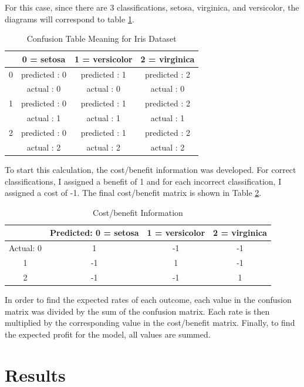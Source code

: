 \documentclass[journal]{IEEEtran}
\begin{document}
For this case, since there are 3 classifications, setosa, virginica, and versicolor, the diagrams will correspond to table \ref{table:cm-meaning}.

\begin{table}[h!]
\centering
\begin{tabular}{ c || c | c | c }
& 0 = setosa &  1 = versicolor &  2 = virginica \\
\hline
\hline
0 & predicted : 0 & predicted : 1 & predicted : 2 \\
& actual : 0 & actual : 0 & actual : 0 \\
\hline
1 & predicted : 0 & predicted : 1 & predicted : 2 \\
& actual : 1 & actual : 1 & actual : 1 \\
\hline
2 & predicted : 0 & predicted : 1 & predicted : 2 \\
& actual : 2 & actual : 2 & actual : 2 \\
\end{tabular}
\caption{Confusion Table Meaning for Iris Dataset}
\label{table:cm-meaning}
\end{table}

To start this calculation, the cost/benefit information was developed. For correct classifications, I assigned a benefit of 1 and for each incorrect classification, I assigned a cost of -1. The final cost/benefit matrix is shown in Table \ref{table:costmatrix}.

\begin{table}[h!]
\centering
\begin{tabular}{ c || c | c | c }
& Predicted: 0 = setosa &  1 = versicolor &  2 = virginica \\
\hline
\hline
Actual: 0 & 1 & -1 & -1 \\
1 & -1 & 1 & -1 \\
2 & -1 & -1 & 1 \\
\end{tabular}
\caption{Cost/benefit Information}
\label{table:costmatrix}
\end{table}

In order to find the expected rates of each outcome, each value in the confusion matrix was divided by the sum of the confusion matrix. Each rate is then multiplied by the corresponding value in the cost/benefit matrix. Finally, to find the expected profit for the model, all values are summed. 

\section{Results}
\label{sec:results}
\end{document}
